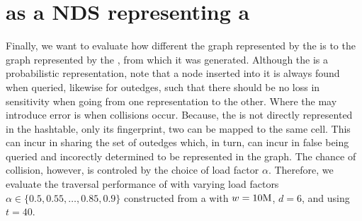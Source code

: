 \section{\dBHT as a NDS representing a \dBG}
\label{sec:results-dbht}

Finally, we want to evaluate how different the graph represented by the \dBHT is to the graph represented by the \dBCM, from which it was generated. Although the \dBHT is a probabilistic representation, note that a node inserted into it is always found when queried, likewise for outedges, such that there should be no loss in sensitivity when going from one representation to the other. Where the \dBHT may introduce error is when collisions occur. Because, the \kmer is not directly represented in the hashtable, only its fingerprint, two  can be mapped to the same cell. This can incur in  sharing the set of outedges which, in turn, can incur in false  being queried and incorectly determined to be represented in the graph. The chance of collision, however, is controled by the choice of load factor $\alpha$. Therefore, we evaluate the traversal performance of  with varying load factors $\alpha \in \{0.5, 0.55, \ldots, 0.85, 0.9\}$ constructed from a \dBCM with $w = 10\mega$, $d = 6$, and using $t = 40$.

